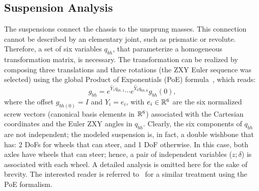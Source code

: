 \subsection{Suspension Analysis}
\label{sec:suspanal}
The suspensions connect the chassis to the unsprung masses. This connection cannot be described by an elementary joint, such as prismatic or revolute. Therefore, a set of six variables $q_{bh}$, that parameterize a homogeneous transformation matrix, is necessary. The transformation can be realized by composing three translations and three rotations (the ZXY Euler sequence was selected) using the global Product of Exponentials (PoE) formula~\cite{Murray:book:1994}, which reads: \begin{equation}\label{eqn:PoE}
	g_{bh}=e^{\hat{Y}_1q_{bh,1}}\cdots e^{\hat{Y}_6q_{bh,6}} g_{bh}(0),
\end{equation}
where the offset $g_{bh(0)}=I$ and $Y_i=e_i$, with $e_i\in\mathbb{R}^6$ are the six normalized screw vectors (canonical basis elements in $\mathbb{R}^6$) associated with the Cartesian coordinates and the Euler ZXY angles in $q_{bh}$.
Clearly, the six components of $q_{bh}$ are not independent; the modeled suspension is, in fact, a double wishbone that has: 2 DoFs for wheels that can steer, and 1 DoF otherwise.
In this case, both axles have wheels that can steer; hence, a pair of independent variables ($z;\delta $) is associated with each wheel.
A detailed analysis is omitted here for the sake of brevity. The interested reader is referred to~\cite{Domenighini:Designs:2023} for a similar treatment using the PoE formalism.

